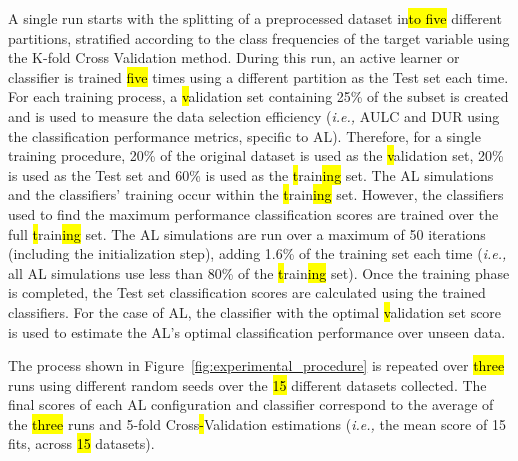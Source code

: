 \documentclass[preprint, 12pt]{elsarticle}
\begin{document}
A single run starts with the splitting of a preprocessed dataset in\hl{to five} 
different partitions, stratified according to the class frequencies of the
target variable using the K-fold Cross Validation method. During this run, an
active learner or classifier is trained \hl{five} times using a different partition as
the Test set each time. For each training process, a \hl{v}alidation set containing
25\% of the subset is created and is used to measure the data selection
efficiency (\textit{i.e.,} AULC and DUR using the classification performance
metrics, specific to AL). Therefore, for a single training procedure, 20\% of
the original dataset is used as the \hl{v}alidation set, 20\% is used as the Test
set and 60\% is used as the \hl{t}rain\hl{ing} set. The AL simulations and the classifiers'
training occur within the \hl{t}rain\hl{ing} set. However, the classifiers used to find the
maximum performance classification scores are trained over the full
\hl{t}rain\hl{ing} set.
The AL simulations are run over a maximum of 50 iterations (including the
initialization step), adding 1.6\% of the training set each time
(\textit{i.e.,} all AL simulations use less than 80\% of the \hl{t}rain\hl{ing} set). Once
the training phase is completed, the Test set classification scores are
calculated using the trained classifiers. For the case of AL, the classifier
with the optimal \hl{v}alidation set score is used to estimate the AL's optimal
classification performance over unseen data.

The process shown in Figure~\ref{fig:experimental_procedure} is repeated over
\hl{three} runs using different random seeds over the \hl{15} different datasets
collected. The final scores of each AL configuration and classifier correspond
to the average of the \hl{three} runs and 5-fold Cross\hl{-}Validation estimations
(\textit{i.e.,} the mean score of 15 fits, across \hl{15} datasets).
\end{document}
